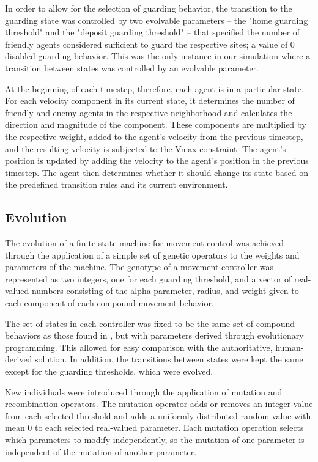 \documentclass[12pt,journal,compsoc]{IEEEtran}
\begin{document}
In order to allow for the selection of guarding behavior, the transition to the guarding state was controlled by two  evolvable parameters -- the "home guarding threshold" and the "deposit guarding threshold" -- that specified the number of friendly agents considered sufficient to guard the respective sites; a value of 0 disabled guarding behavior. This was the only instance in our simulation where a transition between states was controlled by an evolvable parameter.

At the beginning of each timestep, therefore, each agent is in a particular state. For each velocity component in its current state, it determines the number of friendly and enemy agents in the respective neighborhood and calculates the direction and magnitude of the component. These components are multiplied by the respective weight, added to the agent's velocity from the previous timestep, and the resulting velocity is subjected to the Vmax constraint. The agent's position is updated by adding the velocity to the agent's position in the previous timestep. The agent then determines whether it should change its state based on the predefined transition rules and its current environment.

\subsection{Evolution}

The evolution of a finite state machine for movement control was achieved through the application of a simple set of genetic operators to the weights and parameters of the machine. The genotype of a movement controller was represented as two integers, one for each guarding threshold, and a vector of real-valued numbers consisting of the alpha parameter, radius, and weight given to each component of each compound movement behavior.

The set of states in each controller was fixed to be the same set of compound behaviors as those found in \cite{rodriguez2004extending}, but with parameters derived through evolutionary programming. This allowed for easy comparison with the authoritative, human-derived solution. In addition, the transitions between states were kept the same except for the guarding thresholds, which were evolved.

New individuals were introduced through the application of mutation and recombination operators. The mutation operator adds or removes an integer value from each selected threshold and adds a uniformly distributed random value with mean 0 to each selected real-valued parameter. Each mutation operation selects which parameters to modify independently, so the mutation of one parameter is independent of the mutation of another parameter.
\end{document}
